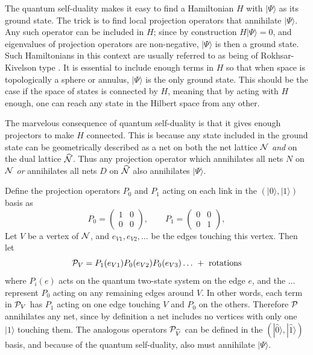 \documentclass[11pt]{article}
\newcommand{\wwr}{|\widehat{0}\rangle}
\newcommand{\xxr}{|\widehat{1}\rangle}
\newcommand{\Nhat}{\widehat{\cal N}}
\begin{document}
The quantum self-duality makes it easy to find a Hamiltonian $H$ with
$|\Psi\rangle$ as its ground state. The trick is to find local
projection operators that annihilate $|\Psi\rangle$. Any such operator
can be included in $H$; since by construction $H|\Psi\rangle=0$, and
eigenvalues of projection operators are non-negative, $|\Psi\rangle$
is then a ground state.  Such Hamiltonians in this context are usually
referred to as being of Rokhsar-Kivelson type \cite{RK}.  It is
essential to include enough terms in $H$ so that when space is
topologically a sphere or annulus, $|\Psi\rangle$ is the only ground
state. This should be the case if the space of states is connected by
$H$, meaning that by acting with $H$ enough, one can reach any state
in the Hilbert space from any other.

The marvelous consequence of quantum self-duality is that it gives
enough projectors to make $H$ connected. This is because any
state included in the ground state can be geometrically described as a
net on both the net lattice ${\cal N}$ {\em and} on the dual lattice
$\Nhat$. Thus any projection operator which annihilates all nets $N$
on ${\cal N}$ {\em or} annihilates all nets $D$ on $\Nhat$ also
  annihilates $|\Psi\rangle$.

Define
the projection operators $P_0$ and $P_1$ acting on each link in the
$(|0\rangle,|1\rangle)$ basis as
\begin{equation}
P_0=
\begin{pmatrix}
1&0\\
0&0
\end{pmatrix}
,\qquad
P_1=
\begin{pmatrix}
0&0\\
0&1
\end{pmatrix},
\label{Pdef}
\end{equation}
Let $V$ be a vertex of ${\cal N}$, and $e_{V1},e_{V2}, \dots$ be the
edges touching this vertex.  
Then let
\begin{equation}
{\cal P}_{V} = P_1(e_{V1}) P_0(e_{V2}) P_0(e_{V3})\dots\
 + \hbox{ rotations}
\end{equation}
where $P_i(e)$ acts on the quantum two-state system on the edge $e$,
and the $\dots$ represent $P_0$ acting on any remaining edges around $V$.
In other words, each term in ${\cal P}_V$ has $P_1$ acting on one edge
touching $V$ and $P_0$ on the others. Therefore ${\cal P}$ annihilates
any net, since by definition a net includes no vertices with only one
$|1\rangle$ touching them. The analogous operators ${\cal
P}_{\widehat{V}}$ can be defined in the $(\wwr,\xxr)$ basis, and
because of the quantum self-duality, also must annihilate
$|\Psi\rangle$. 
\end{document}
